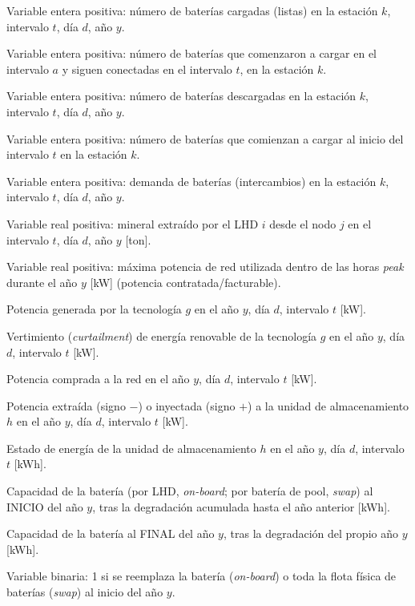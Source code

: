 \begin{description}[leftmargin=3cm, style=nextline]
    \item[$S_{k,y,d,t}$] Variable entera positiva: número de baterías cargadas (listas) en la estación $k$, intervalo $t$, día $d$, año $y$.
    \item[$Sv_{k,y,d,t,a}$] Variable entera positiva: número de baterías que comenzaron a cargar en el intervalo $a$ y siguen conectadas en el intervalo $t$, en la estación $k$.
    \item[$X^{dch}_{k,y,d,t}$] Variable entera positiva: número de baterías descargadas en la estación $k$, intervalo $t$, día $d$, año $y$.
    \item[$X^{ini}_{k,y,d,t}$] Variable entera positiva: número de baterías que comienzan a cargar al inicio del intervalo $t$ en la estación $k$.
    \item[$W_{k,y,d,t}$] Variable entera positiva: demanda de baterías (intercambios) en la estación $k$, intervalo $t$, día $d$, año $y$.
    \item[$M_{i,j,y,d,t}$] Variable real positiva: mineral extraído por el LHD $i$ desde el nodo $j$ en el intervalo $t$, día $d$, año $y$ [ton].
    \item[$P^{pot}_y$] Variable real positiva: máxima potencia de red utilizada dentro de las horas \textit{peak} durante el año $y$ [kW] (potencia contratada/facturable).
    \item [$P^{gen}_{g,y,d,t}$] Potencia generada por la tecnología $g$ en el año $y$, día $d$, intervalo $t$ [kW].
    \item [$Curt_{g,y,d,t}$] Vertimiento (\textit{curtailment}) de energía renovable de la tecnología $g$ en el año $y$, día $d$, intervalo $t$ [kW].
    \item [$P^{red}_{y,d,t}$] Potencia comprada a la red en el año $y$, día $d$, intervalo $t$ [kW].
    \item [$P^{bat}_{h,y,d,t}$] Potencia extraída (signo $-$) o inyectada (signo $+$) a la unidad de almacenamiento $h$ en el año $y$, día $d$, intervalo $t$ [kW].
    \item [$A_{h,y,d,t}$] Estado de energía de la unidad de almacenamiento $h$ en el año $y$, día $d$, intervalo $t$ [kWh].
    \item [$\bar b_y$] Capacidad de la batería (por LHD, \textit{on-board}; por batería de pool, \textit{swap}) al INICIO del año $y$, tras la degradación acumulada hasta el año anterior [kWh].
    \item [$D_y$] Capacidad de la batería al FINAL del año $y$, tras la degradación del propio año $y$ [kWh].
    \item [$R_y$] Variable binaria: 1 si se reemplaza la batería (\textit{on-board}) o toda la flota física de baterías (\textit{swap}) al inicio del año $y$.

\end{description}
